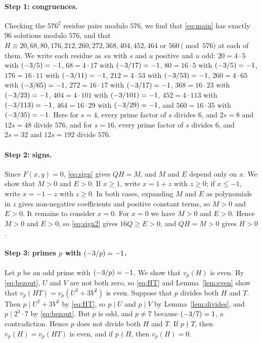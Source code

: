 \documentclass[11pt]{article}
\newcommand{\leg}[2]{\mathchoice{\biggl(\dfrac{#1}{#2}\biggr)}{(#1/#2)}{(#1/#2)}{(#1/#2)}}
\begin{document}
\paragraph{Step 1: congruences.} Checking the $576^2$ residue pairs modulo $576$, we find that \eqref{eq:main} has exactly 96 solutions modulo $576$, and that $H\equiv20,\allowbreak 68,\allowbreak 80,\allowbreak 176,\allowbreak 212,\allowbreak 260,\allowbreak 272,\allowbreak 368,\allowbreak 404,\allowbreak 452,\allowbreak 464\text{ or }560\pmod{576}$ at each of them. We write each residue as $su$ with $s$ and $u$ positive and $u$ odd: $20=4\cdot5$ with $\leg{-3}{5}=-1$, $68=4\cdot17$ with $\leg{-3}{17}=-1$, $80=16\cdot5$ with $\leg{-3}{5}=-1$, $176=16\cdot11$ with $\leg{-3}{11}=-1$, $212=4\cdot53$ with $\leg{-3}{53}=-1$, $260=4\cdot65$ with $\leg{-3}{65}=-1$, $272=16\cdot17$ with $\leg{-3}{17}=-1$, $368=16\cdot23$ with $\leg{-3}{23}=-1$, $404=4\cdot101$ with $\leg{-3}{101}=-1$, $452=4\cdot113$ with $\leg{-3}{113}=-1$, $464=16\cdot29$ with $\leg{-3}{29}=-1$, and $560=16\cdot35$ with $\leg{-3}{35}=-1$. Here for $s=4$, every prime factor of $s$ divides $6$, and $2s=8$ and $12s=48$ divide $576$, and for $s=16$, every prime factor of $s$ divides $6$, and $2s=32$ and $12s=192$ divide $576$.

\paragraph{Step 2: signs.} Since $F(x,y)=0$, \eqref{eq:sign} gives $QH=M$, and $M$ and $E$ depend only on $x$. We show that $M>0$ and $E>0$. If $x\geq1$, write $x=1+z$ with $z\geq0$; if $x\leq-1$, write $x=-1-z$ with $z\geq0$. In both cases, expanding $M$ and $E$ as polynomials in $z$ gives non-negative coefficients and positive constant terms, so $M>0$ and $E>0$. It remains to consider $x=0$. For $x=0$ we have $M>0$ and $E>0$. Hence $M>0$ and $E>0$, so \eqref{eq:sign2} gives $16Q\geq E>0$, and $QH=M>0$ gives $H>0$.

\paragraph{\texorpdfstring{Step 3: primes $p$ with $\leg{-3}{p}=-1$.}{Step 3: inert primes.}} Let $p$ be an odd prime with $\leg{-3}{p}=-1$. We show that $v_p(H)$ is even. By \eqref{eq:bezout}, $U$ and $V$ are not both zero, so \eqref{eq:HT} and Lemma~\ref{lem:even} show that $v_p(HT)=v_p(U^2+3V^2)$ is even. Suppose that $p$ divides both $H$ and $T$. Then $p\mid U^2+3V^2$ by \eqref{eq:HT}, so $p\mid U$ and $p\mid V$ by Lemma~\ref{lem:divides}, and $p\mid 2^{3}\cdot 7$ by \eqref{eq:bezout}. But $p$ is odd, and $p\neq7$ because $\leg{-3}{7}=1$, a contradiction. Hence $p$ does not divide both $H$ and $T$. If $p\nmid T$, then $v_p(H)=v_p(HT)$ is even, and if $p\nmid H$, then $v_p(H)=0$.
\end{document}
